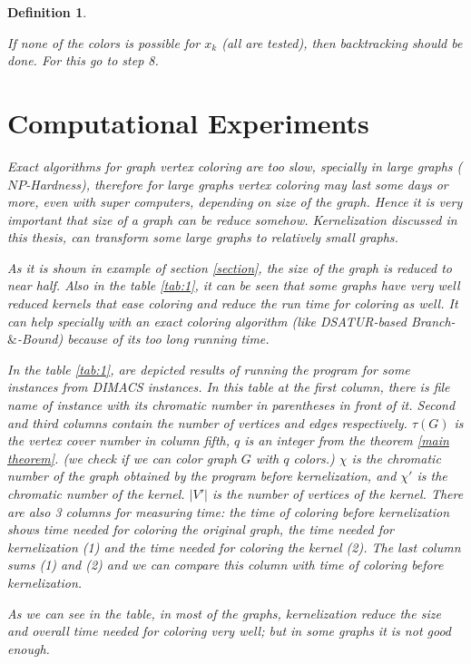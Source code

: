 \documentclass[12pt]{article}
\theoremstyle{slplain}
\newtheorem{defi}{Definition}
\begin{document}
\begin{defi}
\begin{enumerate}
\begin{algorithm}[H]
{\nl If none of the colors is possible for $x_k$ (all are tested), then backtracking
should be done. For this go to step 8.\\}
\end{algorithm}
\afterpage{\null\newpage}

\section{Computational Experiments}

Exact algorithms for graph vertex coloring are too slow, specially in large 
graphs ($NP$-Hardness), therefore for large graphs vertex coloring 
may last some days or more, even with super computers, depending on size of the graph. 
Hence it is very important that size of a graph can be reduce somehow. 
Kernelization discussed in this thesis, can transform some large graphs to relatively small
graphs. 


As it is shown in example of section \ref{section}, the size of the graph is reduced to near half.
Also in the table \ref{tab:1}, it can be seen that some graphs have very well reduced
kernels that ease coloring and reduce the run time for coloring as well. It can
help specially with an exact coloring algorithm (like DSATUR-based Branch-$\&$-Bound) because of its too long running time.

In the table \ref{tab:1}, are depicted results of running the program for some instances
from DIMACS instances\cite{instance}. In this table at the first column, there is file name of instance with its chromatic number in parentheses in front of it. Second and third columns contain the number of vertices and edges respectively. $\tau(G)$ is the vertex cover number in column fifth, $q$ is an integer from the theorem \ref{main theorem}. (we check if we can color graph $G$ with $q$ colors.) $\chi$ is the chromatic number of the graph obtained by the program before kernelization, and $\chi'$ is the chromatic number of the kernel. $|V'|$ is the number of vertices of the kernel. There are also 3 columns for measuring time: the time of coloring before kernelization shows time needed for coloring the original graph, the time needed for kernelization (1) and the time needed for coloring the kernel (2). The last column sums (1) and (2) and we can compare this column with time of coloring before kernelization.

As we can see in the table, in most of the graphs, kernelization reduce the size and overall time needed for coloring very well; but in some graphs it is not good enough.


\end{enumerate}
\end{defi}
\end{document}
